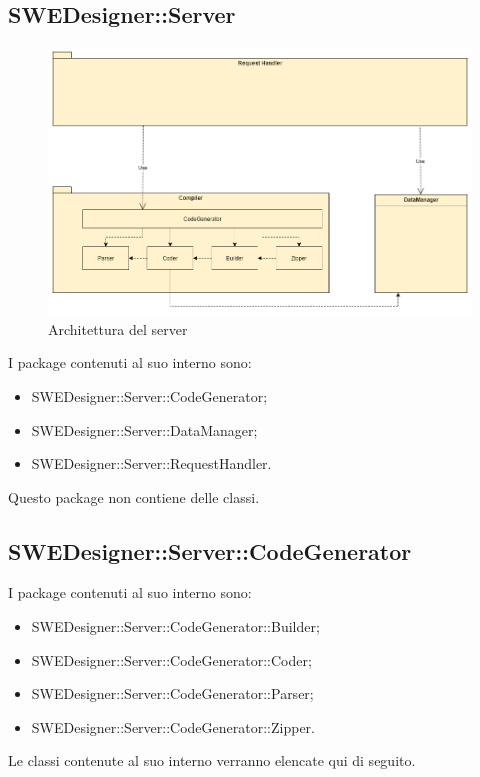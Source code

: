 \documentclass[../DefinizioneDiProdotto.tex]{subfiles}
\begin{document}
			\subsection{SWEDesigner::Server}
			\begin{figure}[H]\label{fig:ServerSubsystem}
				\centering
				\includegraphics[scale=0.4]{Immagini/DiagrammaArchitettura/ServerSubsystem.png}
				\caption{Architettura del server}
			\end{figure}
			I package contenuti al suo interno sono:
			\begin{itemize}
				\item SWEDesigner::Server::CodeGenerator;
				\item SWEDesigner::Server::DataManager;
				\item SWEDesigner::Server::RequestHandler.
			\end{itemize}
			Questo package non contiene delle classi.
			
			\subsection{SWEDesigner::Server::CodeGenerator}
			I package contenuti al suo interno sono:
			\begin{itemize}
				\item SWEDesigner::Server::CodeGenerator::Builder;
				\item SWEDesigner::Server::CodeGenerator::Coder;
				\item SWEDesigner::Server::CodeGenerator::Parser;
				\item SWEDesigner::Server::CodeGenerator::Zipper.
			\end{itemize}
			Le classi contenute al suo interno verranno elencate qui di seguito.
			
\end{document}
